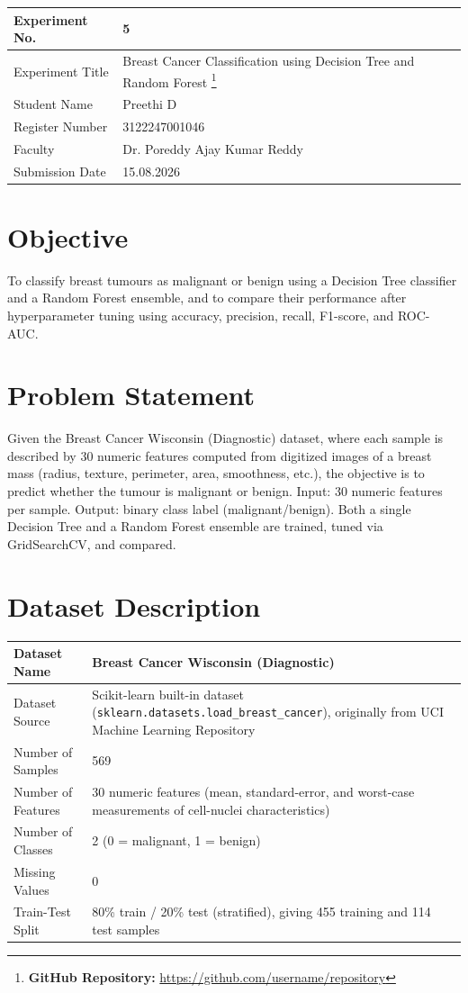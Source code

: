 \documentclass[12pt,a4paper]{article}
\begin{document}
\begin{tabular}{|p{4cm}|p{11cm}|}
\hline
Experiment No. & 5 \\ \hline
Experiment Title & Breast Cancer Classification using Decision Tree and Random Forest
\footnote{\textbf{GitHub Repository: }\url{https://github.com/username/repository}}\\ \hline
Student Name & Preethi D \\ \hline
Register Number & 3122247001046 \\ \hline
Faculty & Dr. Poreddy Ajay Kumar Reddy \\ \hline
Submission Date & 15.08.2026 \\ \hline
\end{tabular}

\section{Objective}
To classify breast tumours as malignant or benign using a Decision Tree classifier and a Random Forest ensemble, and to compare their performance after hyperparameter tuning using accuracy, precision, recall, F1-score, and ROC-AUC.

\section{Problem Statement}
Given the Breast Cancer Wisconsin (Diagnostic) dataset, where each sample is described by 30 numeric features computed from digitized images of a breast mass (radius, texture, perimeter, area, smoothness, etc.), the objective is to predict whether the tumour is malignant or benign. Input: 30 numeric features per sample. Output: binary class label (malignant/benign). Both a single Decision Tree and a Random Forest ensemble are trained, tuned via GridSearchCV, and compared.

\section{Dataset Description}
\begin{longtable}{|p{6cm}|p{8cm}|}
\hline
Dataset Name & Breast Cancer Wisconsin (Diagnostic) \\ \hline
Dataset Source & Scikit-learn built-in dataset (\texttt{sklearn.datasets.load\_breast\_cancer}), originally from UCI Machine Learning Repository \\ \hline
Number of Samples & 569 \\ \hline
Number of Features & 30 numeric features (mean, standard-error, and worst-case measurements of cell-nuclei characteristics) \\ \hline
Number of Classes & 2 (0 = malignant, 1 = benign) \\ \hline
Missing Values & 0 \\ \hline
Train-Test Split & 80\% train / 20\% test (stratified), giving 455 training and 114 test samples \\ \hline
\end{longtable}
\end{document}
